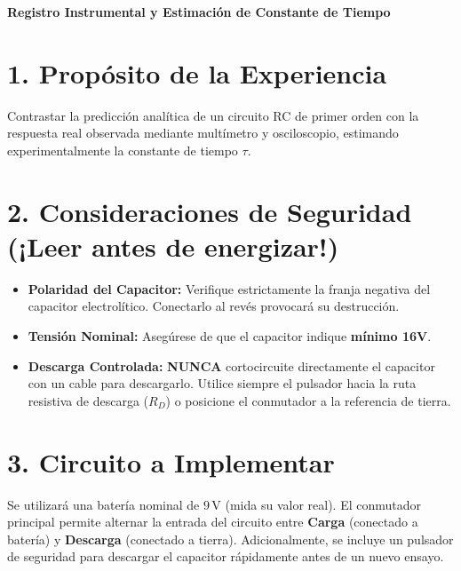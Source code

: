 \documentclass[11pt, a4paper]{article}
\begin{document}
\begin{tcolorbox}[colback=ucbblue!5!white, colframe=ucbblue, title=\textbf{Guía Experimental: Carga y Descarga de un Circuito RC}]
    \centering \textbf{Registro Instrumental y Estimación de Constante de Tiempo}
\end{tcolorbox}

\section*{1. Propósito de la Experiencia}
Contrastar la predicción analítica de un circuito RC de primer orden con la respuesta real observada mediante multímetro y osciloscopio, estimando experimentalmente la constante de tiempo $\tau$.

\section*{2. Consideraciones de Seguridad (¡Leer antes de energizar!)}
\begin{itemize}
    \item \textbf{Polaridad del Capacitor:} Verifique estrictamente la franja negativa del capacitor electrolítico. Conectarlo al revés provocará su destrucción.
    \item \textbf{Tensión Nominal:} Asegúrese de que el capacitor indique \textbf{mínimo 16V}.
    \item \textbf{Descarga Controlada:} \textbf{NUNCA} cortocircuite directamente el capacitor con un cable para descargarlo. Utilice siempre el pulsador hacia la ruta resistiva de descarga ($R_D$) o posicione el conmutador a la referencia de tierra.
\end{itemize}

\section*{3. Circuito a Implementar}
Se utilizará una batería nominal de $9\,\text{V}$ (mida su valor real). El conmutador principal permite alternar la entrada del circuito entre \textbf{Carga} (conectado a batería) y \textbf{Descarga} (conectado a tierra). Adicionalmente, se incluye un pulsador de seguridad para descargar el capacitor rápidamente antes de un nuevo ensayo.
\end{document}
